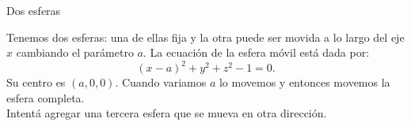 \documentclass[es]{../../common/SurferDesc}%
\begin{document}
\footnotesize
%
\begin{surferPage}
  \begin{surferTitle}Dos esferas\end{surferTitle}
   \begin{surferText}   
   
Tenemos dos esferas: una de ellas fija y la otra puede ser movida a lo largo del eje $x$ cambiando el par\'ametro $a$. La ecuaci\'on de la esfera m\'ovil est\'a dada por:
\[(x-a)^2+y^2+z^2-1=0.\]
Su centro es $(a,0,0)$. Cuando variamos $a$ lo movemos y entonces movemos la esfera completa.\\

Intent\'a agregar una tercera esfera que se mueva en otra direcci\'on.

     \end{surferText}
\end{surferPage}
\end{document}
